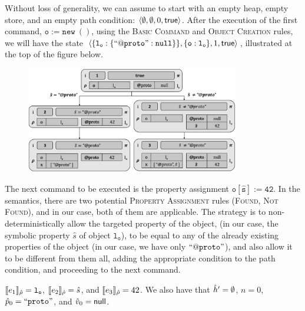 Without loss of generality, we can assume to start with an empty heap, empty store, and an empty path condition: $\langle \emptyset, \emptyset, 0, {\sf true} \rangle$. After the execution of the first command, $\mathtt{o := new\ ()}$, using the \textsc{Basic Command} and \textsc{Object Creation} rules, we will have the state $\langle \{ \mathtt{l_o : \{ ``@proto" : null} \} \}, \{ \mathtt{o : l_o} \} , 1, {\sf true} \rangle$, illustrated at the top of the figure below.

\vspace*{-0.6cm}
\begin{figure}[!h]
\centering
\includegraphics[width=0.83\textwidth]{symbSemEx.png}
\vspace*{-0.5cm}
\end{figure}

The next command to be executed is the property assignment $\mathtt{o[\hat{s}] := 42}$. In the semantics, there are two potential \textsc{Property Assignment} rules (\textsc{Found}, \textsc{Not Found}), and in our case, both of them are applicable. The strategy is to non-deterministically allow the targeted property of the object, (in our case, the symbolic property $\hat{s}$ of object $\mathtt{l_o}$), to be equal to any of the already existing properties of the object (in our case, we have only $\mathtt{``@proto"}$), and also allow it to be different from them all, adding the appropriate condition to the path condition, and proceeding to the next command. 




$\llbracket e_1 \rrbracket_{\hat\rho} = \mathtt{l_o}$, $\llbracket e_2 \rrbracket_{\hat\rho} = \hat{s}$, and $\llbracket e_3 \rrbracket_{\hat\rho} = 42$. We also have that $\hat{h}' = \emptyset$, $n = 0$, $\hat{p}_0 = \mathtt{``proto"}$, and $\hat{v}_0 = {\sf null}$.   









